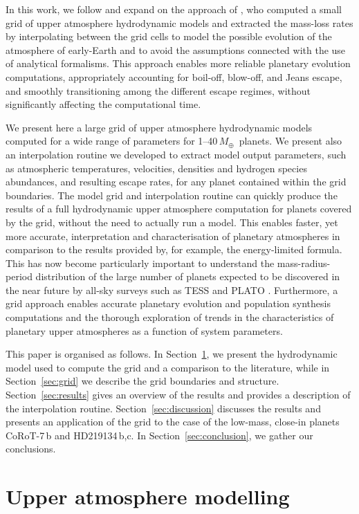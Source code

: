 \documentclass{aa}
\def\Me{\ensuremath{M_{\oplus}}}
\begin{document}
In this work, we follow and expand on the approach of \citet{johnstone2015}, who computed a small grid of upper atmosphere hydrodynamic models and extracted the mass-loss rates by interpolating between the grid cells to model the possible
evolution of the atmosphere of early-Earth and to avoid the assumptions connected with the use of analytical formalisms. This approach enables more reliable planetary evolution computations, appropriately accounting for boil-off, blow-off, and Jeans escape, and smoothly transitioning among the different escape regimes, without significantly affecting the computational time.

We present here a large grid of upper atmosphere hydrodynamic
models computed for a wide range of parameters for {1--40\,\Me\
planets}. We present also an interpolation routine we developed to
extract model output parameters, such as atmospheric temperatures,
velocities, densities and hydrogen species abundances, and
resulting escape rates, for any planet contained within the grid
boundaries. The model grid and interpolation routine can {quickly}
produce the results of a full hydrodynamic upper atmosphere
computation for planets covered by the grid, without the need to
actually run a model. This enables faster, yet more accurate,
interpretation and characterisation of planetary atmospheres in
comparison to the results provided by, for example, the
energy-limited formula. This has now become particularly important
to understand the mass-radius-period distribution of the large
number of planets expected to be discovered in the near future by
all-sky surveys such as TESS and PLATO
\citep{rauer2014,barclay2018}. Furthermore, a grid approach
enables accurate planetary evolution and population synthesis
computations and the thorough exploration of trends in the
characteristics of planetary upper atmospheres as a function of
system parameters.

This paper is organised as follows. In Section~\ref{sec:modelling0}, we present the hydrodynamic model used to compute the grid and a comparison to the literature, while in Section~\ref{sec:grid} we describe the grid boundaries and structure. Section~\ref{sec:results} gives an overview of the results and provides a description of the interpolation routine. Section~\ref{sec:discussion} discusses the results and presents an application of the grid to the case of the low-mass, close-in planets CoRoT-7\,b and HD219134\,b,c. In Section~\ref{sec:conclusion}, we gather our conclusions.
%
\section{Upper atmosphere modelling}\label{sec:modelling0}
\end{document}

